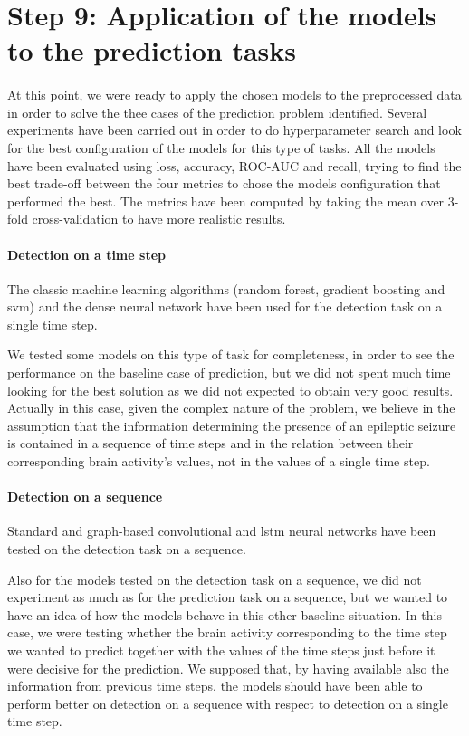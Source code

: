 \section{Step 9: Application of the models to the prediction tasks} \label{sec: step_models_application}
\paragraph{} At this point, we were ready to apply the chosen models to the preprocessed data in order to solve the thee cases of the prediction problem identified. Several experiments have been carried out in order to do hyperparameter search and look for the best configuration of the models for this type of tasks. All the models have been evaluated using loss, accuracy, ROC-AUC and recall, trying to find the best trade-off between the four metrics to chose the models configuration that performed the best. The metrics have been computed by taking the mean over 3-fold cross-validation to have more realistic results.

\paragraph{Detection on a time step} The classic machine learning algorithms (random forest, gradient boosting and \acs{svm}) and the dense neural network have been used for the detection task on a single time step.

We tested some models on this type of task for completeness, in order to see the performance on the baseline case of prediction, but we did not spent much time looking for the best solution as we did not expected to obtain very good results. Actually in this case, given the complex nature of the problem, we believe in the assumption that the information determining the presence of an epileptic seizure is contained in a sequence of time steps and in the relation between their corresponding brain activity's values, not in the values of a single time step.

\paragraph{Detection on a sequence} Standard and graph-based convolutional and \acs{lstm} neural networks have been tested on the detection task on a sequence. 

Also for the models tested on the detection task on a sequence, we did not experiment as much as for the prediction task on a sequence, but we wanted to have an idea of how the models behave in this other baseline situation. In this case, we were testing whether the brain activity corresponding to the time step we wanted to predict together with the values of the time steps just before it were decisive for the prediction. We supposed that, by having available also the information from previous time steps, the models should have been able to perform better on detection on a sequence with respect to detection on a single time step.

